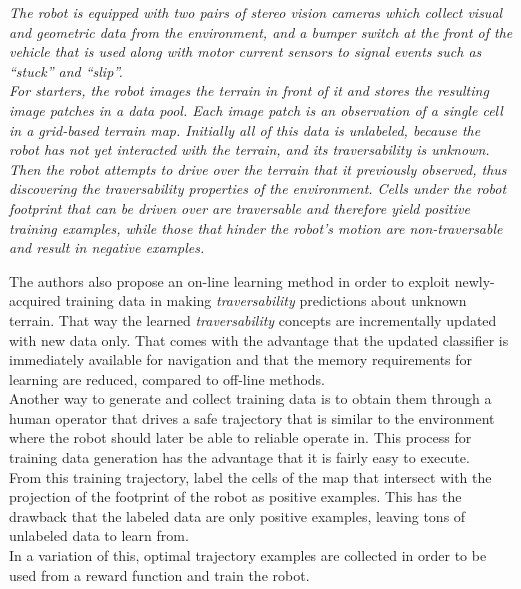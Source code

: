 \documentclass[12pt,a4paper]{report}
\newcommand{\example}{\enquote}
\newcommand{\term}{\textit}
\begin{document}
	\textit{The robot is equipped with two pairs of stereo vision cameras which 
	collect visual and geometric data from the environment, and a bumper switch
	at the front of the vehicle that is used along with motor current sensors to 
	signal events such as \example{stuck} and \example{slip}.
	\\
	For starters, the robot images the terrain in front of it and stores the 
	resulting image patches in a data pool. Each image patch is an observation 
	of a single cell in a grid-based terrain map. Initially all of this data is 
	unlabeled, because the robot has not yet interacted with the terrain, and its 
	\term{traversability} is unknown. 
	\\
	Then the robot attempts to drive over the terrain that it previously 
	observed, thus discovering the \term{traversability} properties of the environment. 
	Cells under the robot footprint that can be driven over are traversable and 
	therefore yield positive training examples, while those that hinder the robot’s 
	motion are non-traversable	and result in negative examples.}
	
	The authors also propose an on-line learning method in order to exploit 
	newly-acquired training data in making \term{traversability} predictions about 
	unknown terrain. That way the learned \term{traversability} concepts are 
	incrementally updated with new data only. That comes with the advantage that the 
	updated classifier is immediately available for navigation and that the 
	memory requirements for learning are reduced, compared to off-line methods.
	\\
	
	
	
	Another way to generate and collect training data is to obtain them through 
	a human operator that drives a safe trajectory that is similar to the 
	environment where the robot should later be able to reliable operate in. 
	This process for training data generation has the advantage that it is fairly 
	easy to execute.
	\\
	From this training trajectory, \cite{Suger} label the cells of the map that 
	intersect with the projection of the footprint of the robot as positive 
	examples. This has the drawback that the labeled data are only positive 
	examples, leaving tons of unlabeled data to learn from.
	\\
	In a variation of this, optimal trajectory examples are collected \cite{Wigness} 
	in order to be used from a reward function and train the robot.
	
\end{document}
